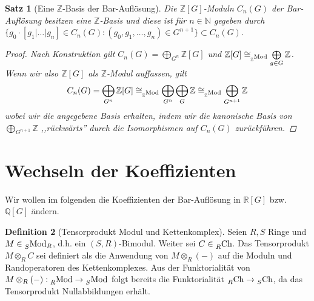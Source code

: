 \documentclass[a4paper,twoside,10pt]{scrreprt}
\newcommand{\Z}{\mathbb{Z}}
\newcommand{\N}{\mathbb{N}}
\newcommand{\Q}{\mathbb{Q}}
\newcommand{\R}{\mathbb{R}}
\newtheorem{satz}{Satz}[section]
\theoremstyle{definition}
\newtheorem{definition}[satz]{Definition}
\begin{document}
\begin{satz}[Eine $\Z$-Basis der Bar-Auflösung]\label{satz:ZBasisOfBarRes}
Die $\Z [G]$-Moduln $C_n(G)$ der Bar-Auflösung besitzen eine $\Z$-Basis und diese ist für $n\in \N$ gegeben durch $\{g_0\cdot [g_1|\ldots|g_n]\in C_n(G):(g_0,g_1,\ldots,g_n)\in G^{n+1}\}\subset C_n(G)$.
\begin{proof}
Nach Konstruktion gilt $C_n(G)=\bigoplus\limits_{G^n} \Z[G]$ und $\Z[G]\cong_{\prescript{}{\Z}{\text{Mod}}}\bigoplus\limits_{g\in G} \Z$. Wenn wir also $\Z[G]$ als $\Z$-Modul auffassen, gilt 
\begin{equation*}
C_n(G)=\bigoplus\limits_{G^n} \Z[G]\cong_{\prescript{}{\Z}{\text{Mod}}}\bigoplus\limits_{G^n}\bigoplus\limits_G \Z\cong_{\prescript{}{\Z}{\text{Mod}}}\bigoplus\limits_{G^{n+1}} \Z
\end{equation*}
wobei wir die angegebene Basis erhalten, indem wir die kanonische Basis von $\bigoplus\limits_{G^{n+1}} \Z$ ,,rückwärts'' durch die Isomorphismen auf $C_n(G)$ zurückführen.
\end{proof}
\end{satz}

\section{Wechseln der Koeffizienten}
Wir wollen im folgenden die Koeffizienten der Bar-Auflösung in $\R[G]$ bzw. $\Q[G]$ ändern. 
\begin{definition}[Tensorprodukt Modul und Kettenkomplex]\label{def:TensorModCh}
Seien $R,S$ Ringe und $M\in \prescript{}{S}{\text{Mod}}_R$, d.h. ein $(S,R)$-Bimodul. Weiter sei $C\in \prescript{}{R}{\text{Ch}}$.
Das Tensorprodukt $M\otimes_{R}C$ sei definiert als die Anwendung von $M\otimes_{R}(-)$ auf die Moduln und Randoperatoren des Kettenkomplexes. Aus der Funktorialität von $M\otimes_{R}(-):\prescript{}{R}{\text{Mod}}\to \prescript{}{S}{\text{Mod}}$ folgt bereits die Funktorialität $\prescript{}{R}{\text{Ch}}\to \prescript{}{S}{\text{Ch}}$, da das Tensorprodukt Nullabbildungen erhält.
\end{definition}
\end{document}
